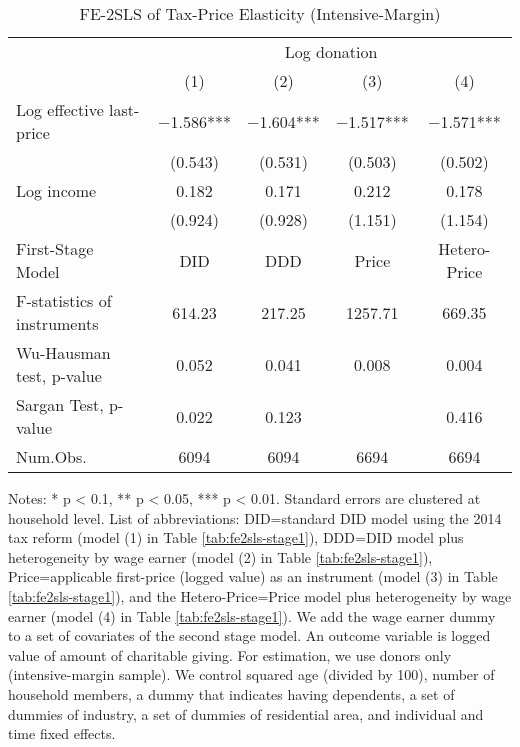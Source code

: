 \begin{table}

\caption{FE-2SLS of Tax-Price Elasticity (Intensive-Margin)\label{tab:fe2sls-int}}
\centering
\fontsize{8}{10}\selectfont
\begin{threeparttable}
\begin{tabular}[t]{lcccc}
\toprule
\multicolumn{1}{c}{ } & \multicolumn{4}{c}{Log donation} \\
\cmidrule(l{3pt}r{3pt}){2-5}
  & (1) & (2) & (3) & (4)\\
\midrule
Log effective last-price & \num{-1.586}*** & \num{-1.604}*** & \num{-1.517}*** & \num{-1.571}***\\
 & (\num{0.543}) & (\num{0.531}) & (\num{0.503}) & (\num{0.502})\\
Log income & \num{0.182} & \num{0.171} & \num{0.212} & \num{0.178}\\
 & (\num{0.924}) & (\num{0.928}) & (\num{1.151}) & (\num{1.154})\\
\midrule
First-Stage Model & DID & DDD & Price & Hetero-Price\\
F-statistics of instruments & 614.23 & 217.25 & 1257.71 & 669.35\\
Wu-Hausman test, p-value & 0.052 & 0.041 & 0.008 & 0.004\\
Sargan Test, p-value & 0.022 & 0.123 &  & 0.416\\
Num.Obs. & \num{6094} & \num{6094} & \num{6694} & \num{6694}\\
\bottomrule
\end{tabular}
\begin{tablenotes}
\item Notes: * p < 0.1, ** p < 0.05, *** p < 0.01. Standard errors are clustered at household level. List of abbreviations: DID=standard DID model using the 2014 tax reform (model (1) in Table \ref{tab:fe2sls-stage1}), DDD=DID model plus heterogeneity by wage earner (model (2) in Table \ref{tab:fe2sls-stage1}), Price=applicable first-price (logged value) as an instrument (model (3) in Table \ref{tab:fe2sls-stage1}), and the Hetero-Price=Price model plus heterogeneity by wage earner (model (4) in Table \ref{tab:fe2sls-stage1}). We add the wage earner dummy to a set of covariates of the second stage model. An outcome variable is logged value of amount of charitable giving. For estimation, we use donors only (intensive-margin sample). We control squared age (divided by 100), number of household members, a dummy that indicates having dependents, a set of dummies of industry, a set of dummies of residential area, and individual and time fixed effects.
\end{tablenotes}
\end{threeparttable}
\end{table}
